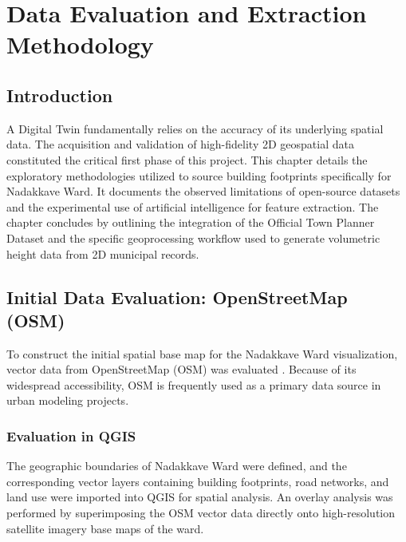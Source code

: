 
\chapter{Data Evaluation and Extraction Methodology}
\label{ch:data}

\section{Introduction}
A Digital Twin fundamentally relies on the accuracy of its underlying spatial data. The acquisition and validation of high-fidelity 2D geospatial data constituted the critical first phase of this project. This chapter details the exploratory methodologies utilized to source building footprints specifically for Nadakkave Ward. It documents the observed limitations of open-source datasets and the experimental use of artificial intelligence for feature extraction. The chapter concludes by outlining the integration of the Official Town Planner Dataset and the specific geoprocessing workflow used to generate volumetric height data from 2D municipal records.

\section{Initial Data Evaluation: OpenStreetMap (OSM)}
To construct the initial spatial base map for the Nadakkave Ward visualization, vector data from OpenStreetMap (OSM) was evaluated \cite{ref_osm}. Because of its widespread accessibility, OSM is frequently used as a primary data source in urban modeling projects.

\subsection{Evaluation in QGIS}
The geographic boundaries of Nadakkave Ward were defined, and the corresponding vector layers containing building footprints, road networks, and land use were imported into QGIS \cite{ref_qgis} for spatial analysis. An overlay analysis was performed by superimposing the OSM vector data directly onto high-resolution satellite imagery base maps of the ward.

